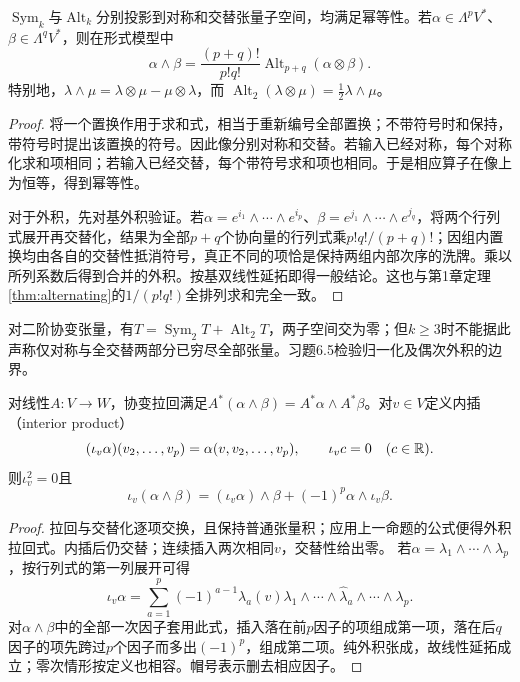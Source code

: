 \begin{proposition}[投影与外积的归一化]\label{prop:alt-normalization}
$\operatorname{Sym}_k$与$\operatorname{Alt}_k$分别投影到对称和交替张量子空间，均满足幂等性。若$\alpha\in\Lambda^pV^*$、$\beta\in\Lambda^qV^*$，则在形式模型中
\[
 \alpha\wedge\beta=\frac{(p+q)!}{p!q!}
 \operatorname{Alt}_{p+q}(\alpha\otimes\beta).
\]
特别地，$\lambda\wedge\mu=\lambda\otimes\mu-\mu\otimes\lambda$，而
$\operatorname{Alt}_2(\lambda\otimes\mu)=\tfrac12\lambda\wedge\mu$。
\end{proposition}
\begin{proof}
将一个置换作用于求和式，相当于重新编号全部置换；不带符号时和保持，带符号时提出该置换的符号。因此像分别对称和交替。若输入已经对称，每个对称化求和项相同；若输入已经交替，每个带符号求和项也相同。于是相应算子在像上为恒等，得到幂等性。

对于外积，先对基外积验证。若$\alpha=e^{i_1}\wedge\cdots\wedge e^{i_p}$、$\beta=e^{j_1}\wedge\cdots\wedge e^{j_q}$，将两个行列式展开再交替化，结果为全部$p+q$个协向量的行列式乘$p!q!/(p+q)!$；因组内置换均由各自的交替性抵消符号，真正不同的项恰是保持两组内部次序的洗牌。乘以所列系数后得到合并的外积。按基双线性延拓即得一般结论。这也与第1章定理\ref{thm:alternating}的$1/(p!q!)$全排列求和完全一致。
\end{proof}
对二阶协变张量，有$T=\operatorname{Sym}_2T+\operatorname{Alt}_2T$，两子空间交为零；但$k\geq3$时不能据此声称仅对称与全交替两部分已穷尽全部张量。习题6.5检验归一化及偶次外积的边界。
\begin{proposition}[外积拉回与内插]\label{prop:exterior-pullback}
对线性$A:V\to W$，协变拉回满足$A^*(\alpha\wedge\beta)=A^*\alpha\wedge A^*\beta$。对$v\in V$定义内插（interior product）
\[
 (\iota_v\alpha)(v_2,\ldots,v_p)=\alpha(v,v_2,\ldots,v_p),
 \qquad\iota_v c=0\quad(c\in\mathbb{R}).
\]
则$\iota_v^2=0$且
\[
 \iota_v(\alpha\wedge\beta)
 =(\iota_v\alpha)\wedge\beta+(-1)^p\alpha\wedge\iota_v\beta.
\]
\end{proposition}
\begin{proof}
拉回与交替化逐项交换，且保持普通张量积；应用上一命题的公式便得外积拉回式。内插后仍交替；连续插入两次相同$v$，交替性给出零。
若$\alpha=\lambda_1\wedge\cdots\wedge\lambda_p$，按行列式的第一列展开可得
\[
 \iota_v\alpha=\sum_{a=1}^p(-1)^{a-1}\lambda_a(v)
 \lambda_1\wedge\cdots\wedge\widehat\lambda_a\wedge\cdots\wedge\lambda_p.
\]
对$\alpha\wedge\beta$中的全部一次因子套用此式，插入落在前$p$因子的项组成第一项，落在后$q$因子的项先跨过$p$个因子而多出$(-1)^p$，组成第二项。纯外积张成，故线性延拓成立；零次情形按定义也相容。帽号表示删去相应因子。
\end{proof}
